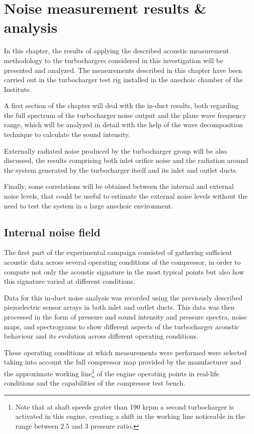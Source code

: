 
\chapter{Noise measurement results \& analysis} \label{cap:results}

\noindent In this chapter, the results of applying the described acoustic measurement methodology to the turbochargers considered in this investigation will be presented and analyzed. The measurements described in this chapter have been carried out in the turbocharger test rig installed in the anechoic chamber of the Institute.

A first section of the chapter will deal with the in-duct results, both regarding the full spectrum of the turbocharger noise output and the plane wave frequency range, which will be analyzed in detail with the help of the wave decomposition technique to calculate the sound intensity.

Externally radiated noise produced by the turbocharger group will be also discussed, the results comprising both inlet orifice noise and the radiation around the system generated by the turbocharger itself and its inlet and outlet ducts.

Finally, some correlations will be obtained between the internal and external noise levels, that could be useful to estimate the external noise levels without the need to test the system in a large anechoic environment.

\section{Internal noise field}\label{sec:res_internal}

The first part of the experimental campaign consisted of gathering sufficient acoustic data across several operating conditions of the compressor, in order to compute not only the acoustic signature in the most typical points but also how this signature varied at different conditions.

Data for this in-duct noise analysis was recorded using the previously described piezoelectric sensor arrays in both inlet and outlet ducts. This data was then processed in the form of pressure and sound intensity and pressure spectra, noise maps, and spectrograms to show different aspects of the turbocharger acoustic behaviour and its evolution across different operating conditions.

These operating conditions at which measurements were performed were selected taking into account the full compressor map provided by the manufacturer and the approximate working line\footnote{Note that at shaft speeds grater than 190 krpm a second turbocharger is activated in this engine, creating a shift in the working line noticeable in the range between 2.5 and 3 pressure ratio.} of the engine operating points in real-life conditions and the capabilities of the compressor test bench. 


